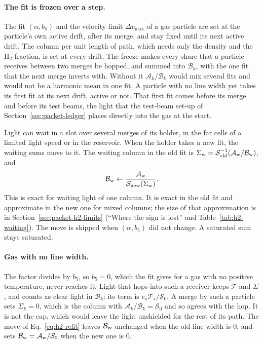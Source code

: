 \paragraph{The fit is frozen over a step.} The fit $(\alpha,b_5)$ and the
velocity limit $\Delta v_{\max}$ of a gas particle are set at the particle's own
active drift, after its merge, and stay fixed until its next active drift. The
column per unit length of path, which needs only the density and the H$_2$
fraction, is set at every drift. The freeze makes every share that a particle
receives between two merges be hopped, and summed into $\mathcal B_k$, with
the one fit that the next merge inverts with. Without it $\mathcal A_k/\mathcal B_k$
would mix several fits and would not be a harmonic mean in one fit. A particle
with no line width yet takes its first fit at its next drift, active or not.
That first fit comes before its merge and before its test beams, the light that
the test-beam set-up of Section~\ref{sec:packet-ledger} places directly into
the gas at the start.

Light can wait in a slot over several merges of its holder, in the far cells
of a limited light speed or in the reservoir. When the holder takes a new fit,
the waiting sums move to it. The waiting column in the old fit is
$\Sigma_{\rm w}=\mathcal S_{\rm old}^{-1}(\mathcal A_{\rm w}/\mathcal B_{\rm w})$, and
\begin{equation}
  \mathcal B_{\rm w} \leftarrow \frac{\mathcal A_{\rm w}}{\mathcal S_{\rm new}(\Sigma_{\rm w})}.
  \label{eq:h2-refit}
\end{equation}
This is exact for waiting light of one column. It is exact in the old fit and
approximate in the new one for mixed columns; the size of that approximation
is in Section~\ref{sec:packet-h2-limits} (``Where the sign is lost'' and
Table~\ref{tab:h2-waiting}). The move is skipped when $(\alpha,b_5)$ did not
change. A saturated sum stays saturated.

\paragraph{Gas with no line width.} The factor divides by $b_5$, so $b_5=0$,
which the fit gives for a gas with no positive temperature, never reaches
it. Light that hops into such a receiver keeps $\mathcal T$ and $\Sigma$, and
counts as clear light in $\mathcal B_k$: its term is
$e_s\mathcal T_s/\mathcal S_0$. A merge by such a particle sets $\Sigma_k=0$,
which is the column with $\mathcal A_k/\mathcal B_k=\mathcal S_0$ and so agrees with
the hop. It is not the cap, which would leave the light unshielded for the rest
of its path. The move of Eq.~\eqref{eq:h2-refit} leaves $\mathcal B_{\rm w}$
unchanged when the old line width is 0, and sets
$\mathcal B_{\rm w}=\mathcal A_{\rm w}/\mathcal S_0$ when the new one is 0.

